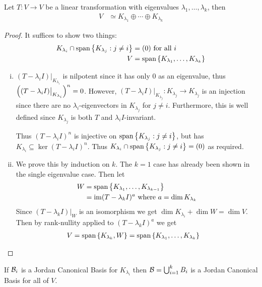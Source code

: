\begin{theorem}
  Let $T : V \to V$ be a linear transformation with eigenvalues $\lambda_1,\ldots,\lambda_k$, then
  \begin{align}
    V &\simeq K_{\lambda_1} \oplus \cdots \oplus K_{\lambda_k}
  \end{align}
\end{theorem}
\begin{proof}
  It suffices to show two things:
  \begin{align}
    K_{\lambda_i} \cap \text{span}\left\{K_{\lambda_j} : j \ne i\right\} &= (0) \text{ for all } i \\
    V &= \text{span}\left\{K_{\lambda_1},\ldots,K_{\lambda_k}\right\}
  \end{align}
  \begin{enumerate}[i.]
    \item $(T-\lambda_iI)\big\rvert_{K_{\lambda_i}}$ is nilpotent since it has only 0 as an eigenvalue, thus
      $\left((T-\lambda_iI)\big\rvert_{K_{\lambda_i}}\right)^n = 0$.
    However, $(T-\lambda_i I)\big\rvert_{K_{\lambda_j}} : K_{\lambda_j} \to K_{\lambda_j}$ is an injection
      since there are no $\lambda_i$-eigenvectors in $K_{\lambda_j}$ for $j \ne i$.
      Furthermore, this is well defined since $K_{\lambda_j}$ is both $T$ and $\lambda_i I$-invariant.

    Thus $(T-\lambda_i I)^n$ is injective on $\text{span}\left\{K_{\lambda_j} : j \ne i\right\}$, but has $K_{\lambda_i} \subseteq \ker (T-\lambda_i I)^n$.
      Thus $K_{\lambda_i} \cap \text{span}\left\{K_{\lambda_j} : j \ne i\right\} = (0)$ as required.

    \item We prove this by induction on $k$. The $k=1$ case has already been shown in the single eigenvalue case. Then let
      \begin{align}
        W &= \text{span}\left\{K_{\lambda_1},\ldots,K_{\lambda_{k-1}}\right\} \\
          &= \operatorname{im}(T-\lambda_kI)^a \text{ where } a = \dim K_{\lambda_k}
      \end{align}
    Since $(T-\lambda_k I)\big\rvert_W$ is an isomorphism we get $\dim K_{\lambda_i} + \dim W = \dim V$.
    Then by rank-nullity applied to $(T-\lambda_kI)^a$ we get
    \begin{align}
      V &= \text{span}\left\{K_{\lambda_k}, W\right\} = \text{span}\left\{K_{\lambda_1},\ldots,K_{\lambda_k}\right\}
    \end{align}
  \end{enumerate}
\end{proof}
\begin{corollary}
  If $\mathcal{B}_i$ is a Jordan Canonical Basis for $K_{\lambda_i}$ then $\mathcal{B} = \bigcup_{i=1}^k B_i$ is a Jordan Canonical Basis for all of $V$.
\end{corollary}

